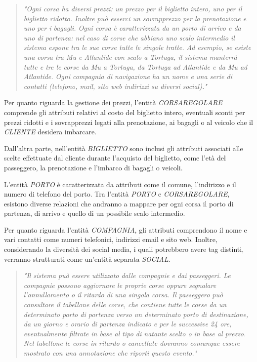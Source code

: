 \begin{quote}
    \textit{"Ogni corsa ha diversi prezzi: un prezzo per il biglietto intero, uno per il biglietto ridotto. Inoltre può esserci un sovrapprezzo per la prenotazione e uno per i bagagli. Ogni corsa è caratterizzata da un porto di arrivo e da uno di partenza: nel caso di corse che abbiano uno scalo intermedio il sistema espone tra le sue corse tutte le singole tratte. Ad esempio, se esiste una corsa tra Mu e Atlantide con scalo a Tortuga, il sistema manterrà tutte e tre le corse da Mu a Tortuga, da Tortuga ad Atlantide e da Mu ad Atlantide. Ogni compagnia di navigazione ha un nome e una serie di contatti (telefono, mail, sito web indirizzi su diversi social)."}
\end{quote}

Per quanto riguarda la gestione dei prezzi, l'entità \textit{CORSAREGOLARE} comprende gli attributi relativi al costo del biglietto intero, eventuali sconti per prezzi ridotti e i sovrapprezzi legati alla prenotazione, ai bagagli o al veicolo che il \textit{CLIENTE} desidera imbarcare.

Dall'altra parte, nell'entità \textit{BIGLIETTO} sono inclusi gli attributi associati alle scelte effettuate dal cliente durante l'acquisto del biglietto, come l'età del passeggero, la prenotazione e l'imbarco di bagagli o veicoli.

L'entità \textit{PORTO} è caratterizzata da attributi come il comune, l'indirizzo e il numero di telefono del porto. Tra l'entità \textit{PORTO} e \textit{CORSAREGOLARE}, esistono diverse relazioni che andranno a mappare per ogni corsa il porto di partenza, di arrivo e quello di un possibile scalo intermedio.

Per quanto riguarda l'entità \textit{COMPAGNIA}, gli attributi comprendono il nome e vari contatti come numeri telefonici, indirizzi email e sito web. Inoltre, considerando la diversità dei social media, i quali potrebbero avere tag distinti, verranno strutturati come un'entità separata \textit{SOCIAL}.

\begin{quote}
    \textit{"Il sistema può essere utilizzato dalle compagnie e dai passeggeri. Le compagnie possono aggiornare le proprie corse oppure segnalare l’annullamento o il ritardo di una singola corsa. Il passeggero può consultare il tabellone delle corse, che contiene tutte le corse da un determinato porto di partenza verso un determinato porto di destinazione, da un giorno e orario di partenza indicato e per le successive 24 ore, eventualmente filtrate in base al tipo di natante scelto o in base al prezzo. Nel tabellone le corse in ritardo o cancellate dovranno comunque essere mostrato con una annotazione che riporti questo evento."}
\end{quote} 

